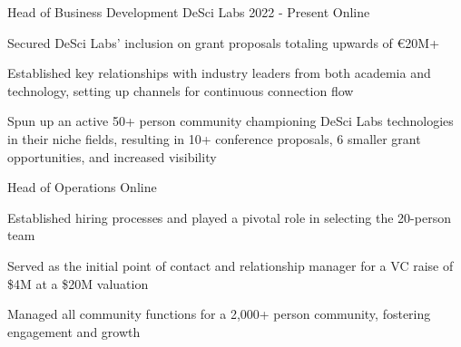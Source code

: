 
\begin{cventries}

  \cventry
    {Head of Business Development} %
    {DeSci Labs} %
    {2022 - Present} %
    {Online} %
    {
      \begin{cvitems} %
        \item {Secured DeSci Labs' inclusion on grant proposals totaling upwards of €20M+}
        \item {Established key relationships with industry leaders from both academia and technology, setting up channels for continuous connection flow}
        \item {Spun up an active 50+ person community championing DeSci Labs technologies in their niche fields, resulting in 10+ conference proposals, 6 smaller grant opportunities, and increased visibility}
      \end{cvitems}
    }

    \cventry
    {Head of Operations} %
    {} %
    {} %
    {Online} %
    {
      \begin{cvitems} %
        \item {Established hiring processes and played a pivotal role in selecting the 20-person team}
        \item {Served as the initial point of contact and relationship manager for a VC raise of \$4M at a \$20M valuation}
        \item {Managed all community functions for a 2,000+ person community, fostering engagement and growth}
      \end{cvitems}
    }


\end{cventries}
